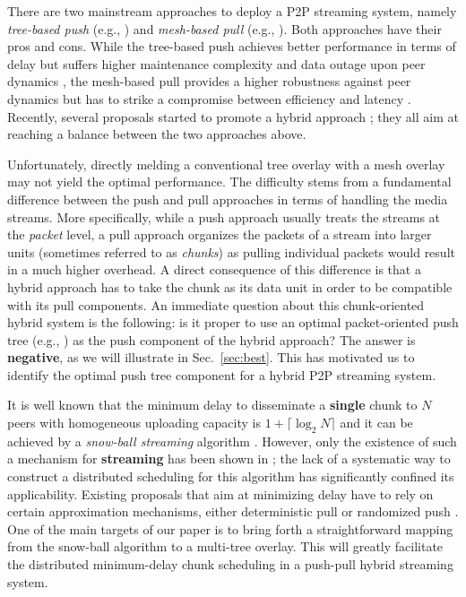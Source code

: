 \documentclass[conference]{IEEEtran}
\begin{document}
  There are two mainstream approaches to deploy a P2P streaming system, namely \textit{tree-based push} (e.g., \cite{BanerjeeBK-SIGCOMM02,CastroDKNRS-SOSP03,VenkataramanYF-ICNP06}) and \textit{mesh-based pull} (e.g., \cite{ZhangLLY-INFOCOM05,HeiLR-IEEECOMMAG08,LiXQKLLZ-INFOCOM08}). Both approaches have their pros and cons. While the tree-based push achieves better performance in terms of delay but suffers higher maintenance complexity and data outage upon peer dynamics \cite{MaghareiRG-INFOCOM07}, the mesh-based pull provides a higher robustness against peer dynamics but has to strike a compromise between efficiency and latency \cite{FengLL-INFOCOM09}. Recently, several proposals started to promote a hybrid approach \cite{WangXL-ICDCS07,ZhangZSY-IEEEJSAC07,WangLX-INFOCOM08}; they all aim at reaching a balance between the two approaches above.

  Unfortunately, directly melding a conventional tree overlay with a mesh overlay may not yield the optimal performance. The difficulty stems from a fundamental difference between the push and pull approaches in terms of handling the media streams. More specifically, while a push approach usually treats the streams at the \textit{packet} level, a pull approach organizes the packets of a stream into larger units (sometimes referred to as \textit{chunks}) as pulling individual packets would result in a much higher overhead. A direct consequence of this difference is that a hybrid approach has to take the chunk as its data unit in order to be compatible with its pull components. An immediate question about this chunk-oriented hybrid system is the following: is it proper to use an optimal packet-oriented push tree (e.g., \cite{LiuSJRC-SIGMETRICS08}) as the push component of the hybrid approach? The answer is \textbf{negative}, as we will illustrate in Sec.~\ref{sec:best}. This has motivated us to identify the optimal push tree component for a hybrid P2P streaming system.

  It is well known that the minimum delay to disseminate a \textbf{single} chunk to $N$ peers with homogeneous uploading capacity is $1+\lceil \log_2 N\rceil$ and it can be achieved by a \textit{snow-ball streaming} algorithm \cite{Liu-MM07}. However, only the existence of such a mechanism for \textbf{streaming} has been shown in \cite{Liu-MM07}; the lack of a systematic way to construct a distributed scheduling for this algorithm has significantly confined its applicability. Existing proposals that aim at minimizing delay have to rely on certain approximation mechanisms, either deterministic pull \cite{FengLL-INFOCOM09} or randomized push \cite{BonaldMMPT-SIGMETRICS08}. One of the main targets of our paper is to bring forth a straightforward mapping from the snow-ball algorithm to a multi-tree overlay. This will greatly facilitate the distributed minimum-delay chunk scheduling in a push-pull hybrid streaming system.
\end{document}
